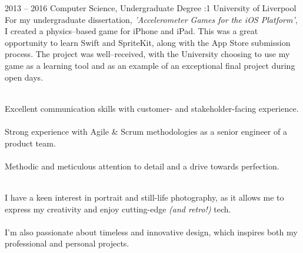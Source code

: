 \documentclass[8pt]{developercv} %
\begin{document}


\begin{entrylist}
	\entry
		{2013 -- 2016}
		{Computer Science, Undergraduate Degree   :1}
		{University of Liverpool}
		{For my undergraduate dissertation, \textit{'Accelerometer Games for the iOS Platform’}, I created a physics--based game for iPhone and iPad. This was a great opportunity to learn Swift and SpriteKit, along with the App Store submission process. The project was well--received, with the University choosing to use my game as a learning tool and as an example of an exceptional final project during open days.}
\end{entrylist}

\vspace{0.5cm}
\begin{minipage}[t]{0.45\textwidth}
	\vspace{-\baselineskip} %

	\\
	Excellent communication skills with customer- and stakeholder-facing experience.\\\\
    Strong experience with Agile \& Scrum methodologies as a senior engineer of a product team.\\\\
    Methodic and meticulous attention to detail and a drive towards perfection.
\end{minipage}
\hfill
\begin{minipage}[t]{0.45\textwidth}
	\vspace{-\baselineskip} %
	
	\\
	 I have a keen interest in portrait and still-life photography, as it allows me to express my creativity and enjoy cutting-edge \textit{(and retro!)} tech.\\\\
        I'm also passionate about timeless and innovative design, which inspires both my professional and personal projects.
\end{minipage}


\end{document}
